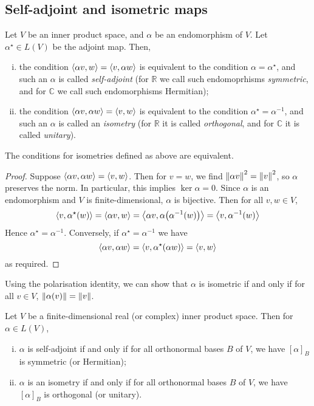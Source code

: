 \subsection{Self-adjoint and isometric maps}
\begin{definition}
	Let \( V \) be an inner product space, and \( \alpha \) be an endomorphism of \( V \).
	Let \( \alpha^\star \in L(V) \) be the adjoint map.
	Then,
	\begin{enumerate}[(i)]
		\item the condition \( \left\langle{\alpha v, w}\right\rangle = \left\langle{v, \alpha w}\right\rangle \) is equivalent to the condition \( \alpha = \alpha^\star \), and such an \( \alpha \) is called \textit{self-adjoint} (for \( \mathbb R \) we call such endomoprhisms \textit{symmetric}, and for \( \mathbb C \) we call such endomorphisms Hermitian);
		\item the condition \( \left\langle{\alpha v, \alpha w}\right\rangle = \left\langle{v, w}\right\rangle \) is equivalent to the condition \( \alpha^\star = \alpha^{-1} \), and such an \( \alpha \) is called an \textit{isometry} (for \( \mathbb R \) it is called \textit{orthogonal}, and for \( \mathbb C \) it is called \textit{unitary}).
	\end{enumerate}
\end{definition}
\begin{proposition}
	The conditions for isometries defined as above are equivalent.
\end{proposition}
\begin{proof}
	Suppose \( \left\langle{\alpha v, \alpha w}\right\rangle = \left\langle{v,w}\right\rangle \).
	Then for \( v = w \), we find \( \norm{\alpha v}^2 = \norm{v}^2 \), so \( \alpha \) preserves the norm.
	In particular, this implies \( \ker \alpha = \qty{0} \).
	Since \( \alpha \) is an endomorphism and \( V \) is finite-dimensional, \( \alpha \) is bijective.
	Then for all \( v, w \in V \),
	\[
		\left\langle{v, \alpha^\star(w)}\right\rangle = \left\langle{\alpha v, w}\right\rangle = \left\langle{\alpha v, \alpha\qty(\alpha^{-1}(w))}\right\rangle = \left\langle{v, \alpha^{-1}(w)}\right\rangle
	\]
	Hence \( \alpha^\star = \alpha^{-1} \).
	Conversely, if \( \alpha^\star = \alpha^{-1} \) we have
	\[
		\left\langle{\alpha v, \alpha w}\right\rangle = \left\langle{v, \alpha^\star(\alpha w)}\right\rangle = \left\langle{v, w}\right\rangle
	\]
	as required.
\end{proof}
\begin{remark}
	Using the polarisation identity, we can show that \( \alpha \) is isometric if and only if for all \( v \in V \), \( \norm{\alpha(v)} = \norm{v} \).
\end{remark}
\begin{lemma}
	Let \( V \) be a finite-dimensional real (or complex) inner product space.
	Then for \( \alpha \in L(V) \),
	\begin{enumerate}[(i)]
		\item \( \alpha \) is self-adjoint if and only if for all orthonormal bases \( B \) of \( V \), we have \( [\alpha]_B \) is symmetric (or Hermitian);
		\item \( \alpha \) is an isometry if and only if for all orthonormal bases \( B \) of \( V \), we have \( [\alpha]_B \) is orthogonal (or unitary).
	\end{enumerate}
\end{lemma}
